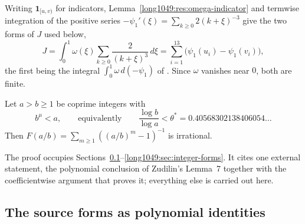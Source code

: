 \noindent Writing $\mathbf 1_{[u,v)}$ for indicators, Lemma~\ref{long1049:res:omega-indicator}
and termwise integration of the positive series
$-\psi_1'(\xi)=\sum_{k\ge0}2(k+\xi)^{-3}$ give the two forms of $J$ used below,
\[
 J=\int_0^1\omega(\xi)\sum_{k\ge0}\frac{2}{(k+\xi)^{3}}\,d\xi
  =\sum_{i=1}^{13}\bigl(\psi_1(u_i)-\psi_1(v_i)\bigr),
\]
the first being the integral $\int_0^1\omega\,d(-\psi_1)$ of
\cite[Lemma~2]{zudilin2004}.  Since $\omega$ vanishes near $0$, both are finite.

\begin{theorem}\label{long1049:res:region}
Let $a>b\ge1$ be coprime integers with
\[
 b^{\mu}<a,
 \qquad\text{equivalently}\qquad
 \frac{\log b}{\log a}<\theta^{*}=0.40568302138406054\ldots
\]
Then $F(a/b)=\sum_{m\ge1}(( a/b)^{m}-1)^{-1}$ is irrational.
\end{theorem}

The proof occupies Sections~\ref{long1049:sec:source-forms}--\ref{long1049:sec:integer-forms}.  It
cites one external statement, the polynomial conclusion of Zudilin's Lemma~7
together with the coefficientwise argument that proves it; everything else is
carried out here.

\subsection{The source forms as polynomial
identities}\label{long1049:sec:source-forms}

